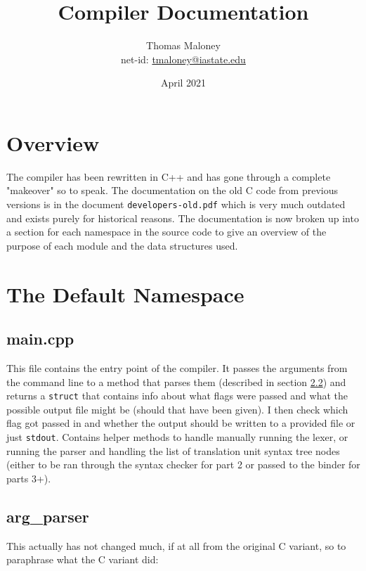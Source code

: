 \documentclass{article}
\title{Compiler Documentation}
\author{Thomas Maloney \\ 
net-id: \href{mailto:tmaloney@iastate.edu}{tmaloney@iastate.edu}}
\date{April 2021}
\begin{document}
\maketitle

\tableofcontents
\newcommand{\code}[1]{\texttt{#1}}
\newcommand{\Z}{\mathbb{Z}}
\newcommand{\R}{\mathbb{R}}

\newpage
\section{Overview}
The compiler has been rewritten in C++ and has gone through a complete "makeover" so to speak.
The documentation on the old C code from previous versions is in the document \code{developers-old.pdf} which is very much outdated and exists purely for historical reasons.
The documentation is now broken up into a section for each namespace in the source code to give an overview of the purpose of each module and the data structures used.



\section{The Default Namespace}
\label{default:namespace}

\subsection{main.cpp}
\label{default:main}
This file contains the entry point of the compiler.
It passes the arguments from the command line to a method that parses them (described in section \ref{defautl:argparser}) and returns a \code{struct} that contains info about what flags were passed and what the possible output file might be (should that have been given).
I then check which flag got passed in and whether the output should be written to a provided file or just \code{stdout}.
Contains helper methods to handle manually running the lexer, or running the parser and handling the list of translation unit syntax tree nodes (either to be ran through the syntax checker for part 2 or passed to the binder for parts 3+).

\subsection{arg\_parser}
\label{defautl:argparser}
This actually has not changed much, if at all from the original C variant, so to paraphrase what the C variant did:
\end{document}
